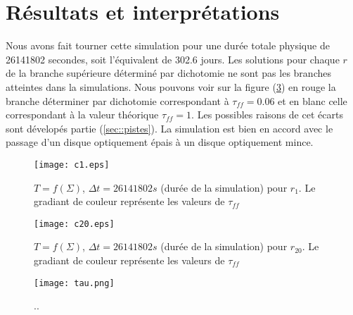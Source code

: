 \section{Résultats et interprétations}

Nous avons fait tourner cette simulation pour une durée totale physique de 26141802 secondes, soit l'équivalent de 302.6 jours. 
Les solutions pour chaque $r$ de la branche supérieure déterminé par dichotomie ne sont pas les branches atteintes dans la simulations. Nous pouvons voir sur la figure (\ref{fig:tau.png}) en rouge la branche déterminer par dichotomie correspondant à $\tau_{ff} = 0.06 $ et en blanc celle correspondant à la valeur théorique $\tau_{ff} = 1$. Les possibles raisons de cet écarts sont dévelopés partie (\ref{sec::pistes}). La simulation est bien en accord avec le passage d'un disque optiquement épais à un disque optiquement mince.  

\begin{figure}
  \begin{center}
    \texttt{[image: c1.eps]}
  \end{center}
  \caption{$T=f(\Sigma)$, $\Delta t = 26141802 s$ (durée de la simulation) pour $r_{1}$. Le gradiant de couleur représente les valeurs de $\tau_{ff}$}
  \label{fig:c1.eps}
\end{figure} 

\begin{figure}
  \begin{center}
    \texttt{[image: c20.eps]}
  \end{center}
  \caption{$T=f(\Sigma)$, $\Delta t = 26141802 s$ (durée de la simulation) pour $r_{20}$. Le gradiant de couleur représente les valeurs de $\tau_{ff}$}
  \label{fig:c20.eps}
\end{figure}


\begin{figure}
  \begin{center}
    \texttt{[image: tau.png]}
  \end{center}
  \caption{..}
  \label{fig:tau.png}
\end{figure} 

